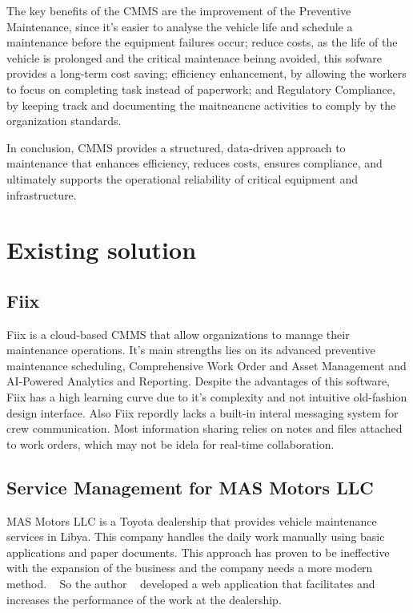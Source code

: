 The key benefits of the \ac{CMMS} are the improvement of the Preventive Maintenance, since it's easier to analyse the vehicle life and schedule a maintenance before the equipment failures occur; reduce costs, as the life of the vehicle is prolonged and the critical maintenace beinng avoided, this sofware provides a long-term cost saving; efficiency enhancement, by allowing the workers to focus on completing task instead of paperwork; and Regulatory Compliance, by keeping track and documenting the maitneancne activities to comply by the organization standards. 



In conclusion, \ac{CMMS} provides a structured, data-driven approach to maintenance that enhances efficiency, reduces costs, ensures compliance, and ultimately supports the operational reliability of critical equipment and infrastructure.





\section{Existing solution}

\subsection{Fiix}
Fiix is a cloud-based CMMS that allow organizations to manage their maintenance operations. 
It's main strengths lies on its advanced preventive maintenance scheduling, Comprehensive Work Order and Asset Management and AI-Powered Analytics and Reporting.
Despite the advantages of this software, Fiix has a high learning curve due to it's complexity and not intuitive old-fashion design interface. 
Also Fiix repordly lacks a built-in interal messaging system for crew communication. Most information sharing relies on notes and files attached to work orders, which may not be idela for real-time collaboration.

\subsection{Service Management for MAS Motors LLC}
MAS Motors LLC is a Toyota dealership that provides vehicle maintenance services in Libya.
This company handles the daily work manually using basic applications and paper documents.
This approach has proven to be ineffective with the expansion of the business and the company needs a more modern method. ~\cite{MAS_MOTORS}
So the author ~\citet{MAS_MOTORS} developed a web application that facilitates and increases the performance of the work at the dealership.

